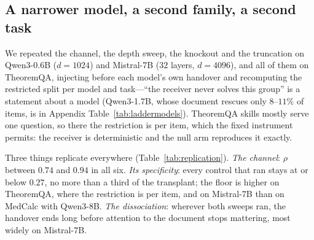 \documentclass{article}
\begin{document}
\subsection{A narrower model, a second family, a second task}
\label{sec:ladder}

We repeated the channel, the depth sweep, the knockout and the truncation on
Qwen3-0.6B ($d=1024$) and Mistral-7B ($32$ layers, $d=4096$), and all of them on
TheoremQA, injecting before each model's own handover and recomputing the
restricted split per model and task---``the receiver never solves this group''
is a statement about a model (Qwen3-1.7B, whose document rescues only $8$--$11\%$
of items, is in Appendix Table~\ref{tab:laddermodels}). TheoremQA skills mostly
serve one question, so there the restriction is per item, which the fixed
instrument permits: the receiver is deterministic and the null arm reproduces it
exactly.

\begin{table}[t]
\caption{Every core measurement, per task and model, after the instrument fix.
$\rho$: the span transplant at the injection layer (Qwen3-8B $8$, Qwen3-0.6B $6$,
Mistral-7B $4$). Max control: the largest of half dose, another skill, permuted
positions and noise. Handover: relative depth between the last layer with
$\rho \ge 0.5$ and the first below. Reading: relative depth of the first
knockout layer that keeps at least half the rescued items. $k^{*}$: half of the
rank curve's range above $k=16$. ``--'': not run after the fix.}
\label{tab:replication}
\centering
\footnotesize
\setlength{\tabcolsep}{4pt}

\end{table}

Three things replicate everywhere (Table~\ref{tab:replication}). \emph{The
channel}: $\rho$ between $0.74$ and $0.94$ in all six. \emph{Its specificity}:
every control that ran stays at or below $0.27$, no more than a third of the
transplant; the floor is higher on TheoremQA, where the restriction is per
item, and on Mistral-7B than on MedCalc with Qwen3-8B. \emph{The dissociation}: wherever both sweeps ran, the
handover ends long before attention to the document stops mattering, most
widely on Mistral-7B.
\end{document}
